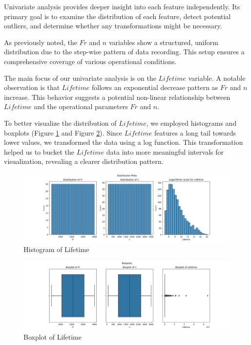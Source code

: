 Univariate analysis provides deeper insight into each feature independently. Its primary goal is to examine the distribution of each feature, detect potential outliers, and determine whether any transformations might be necessary.

As previously noted, the $Fr$ and $n$ variables show a structured, uniform distribution due to the step-wise pattern of data recording. This setup ensures a comprehensive coverage of various operational conditions.

The main focus of our univariate analysis is on the $Lifetime$ variable. A notable observation is that $Lifetime$ follows an exponential decrease pattern as $Fr$ and $n$ increase. This behavior suggests a potential non-linear relationship between $Lifetime$ and the operational parameters $Fr$ and $n$.

To better visualize the distribution of $Lifetime$, we employed histograms and boxplots (Figure \ref{fig:bearings-histogram} and Figure \ref{fig:bearings-boxplot}). Since $Lifetime$ features a long tail towards lower values, we transformed the data using a log function. This transformation helped us to bucket the $Lifetime$ data into more meaningful intervals for visualization, revealing a clearer distribution pattern.

\begin{figure}[ht]
    \centering
    \includegraphics[width=\textwidth]{assets/bearings-eda/histogram.png}
    \caption{Histogram of Lifetime}
    \label{fig:bearings-histogram}
\end{figure}

\begin{figure}[ht]
    \centering
    \includegraphics[width=\textwidth]{assets/bearings-eda/boxplot.png}
    \caption{Boxplot of Lifetime}
    \label{fig:bearings-boxplot}
\end{figure}

